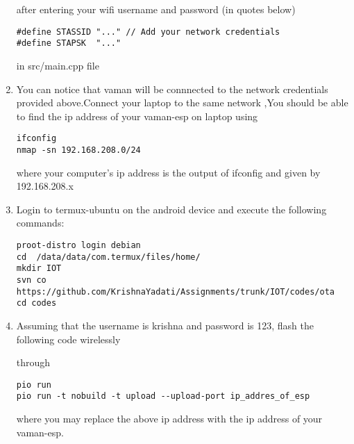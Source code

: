 \documentclass[10pt, a4paper]{article}
\begin{document}
\begin{enumerate}
after entering your wifi username and password (in quotes below)
\begin{lstlisting}
#define STASSID "..." // Add your network credentials
#define STAPSK  "..."
\end{lstlisting}
in src/main.cpp file
\item You can notice that vaman will be connnected to the network credentials provided above.Connect your laptop to the same network ,You should be able to find the ip address of your vaman-esp on laptop using 
\begin{lstlisting}
ifconfig
nmap -sn 192.168.208.0/24
\end{lstlisting}
where your computer's ip address is the output of ifconfig and given by 192.168.208.x
\item Login to termux-ubuntu on the android device and execute the following commands:
\begin{lstlisting}
proot-distro login debian
cd  /data/data/com.termux/files/home/
mkdir IOT
svn co https://github.com/KrishnaYadati/Assignments/trunk/IOT/codes/ota
cd codes
\end{lstlisting}
\item Assuming that the username is krishna and password is 123, flash the following code wirelessly
\begin{center}
\end{center}
through 
\begin{lstlisting}
pio run 
pio run -t nobuild -t upload --upload-port ip_addres_of_esp
\end{lstlisting}
where you may replace the above ip address with the ip address of your vaman-esp.
\end{enumerate}
\end{document}

